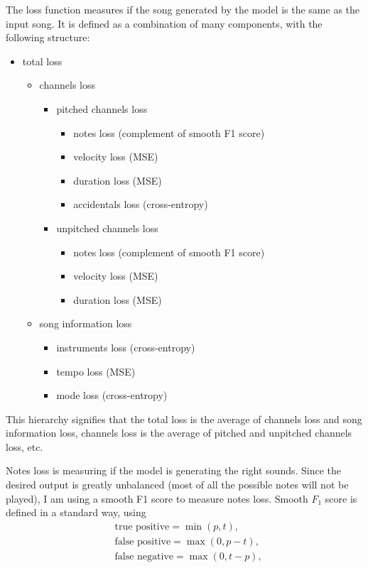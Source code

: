\documentclass[en]{pracamgr}
\begin{document}
The loss function measures if the song generated by the model is the same as the input song. It is defined as a combination of many components, with the following structure:
\begin{itemize}
    \item total loss
	\begin{itemize}
	    \item channels loss
		\begin{itemize}
			\item pitched channels loss
            \begin{itemize}
                \item notes loss (complement of smooth F1 score)
                \item velocity loss (MSE)
                \item duration loss (MSE)
                \item accidentals loss (cross-entropy)
            \end{itemize}
			\item unpitched channels loss
            \begin{itemize}
                \item notes loss (complement of smooth F1 score)
                \item velocity loss (MSE)
                \item duration loss (MSE)
            \end{itemize}
		\end{itemize}
        \item song information loss
        \begin{itemize}
            \item instruments loss (cross-entropy)
            \item tempo loss (MSE)
            \item mode loss (cross-entropy)
        \end{itemize}
	\end{itemize}
\end{itemize}

This hierarchy signifies that the total loss is the average of channels loss and song information loss, channels loss is the average of pitched and unpitched channels loss, etc.

Notes loss is measuring if the model is generating the right sounds.
Since the desired output is greatly unbalanced (most of all the possible notes will not be played), I am using a smooth F1 score to measure notes loss.
Smooth $F_1$ score is defined in a standard way, using
\nopagebreak
\begin{align}
    & \textrm{true positive} = \min(p, t), \\
    & \textrm{false positive} = \max(0, p - t), \\
    & \textrm{false negative} = \max(0, t - p),
\end{align}
\end{document}
